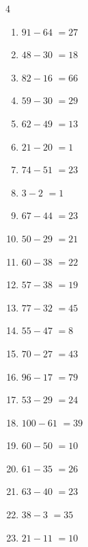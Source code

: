 \begin{multicols}{4}
\begin{enumerate}
  \item $91-64$
        $=27$

  \item $48-30$
        $=18$

  \item $82-16$
        $=66$

  \item $59-30$
        $=29$

  \item $62-49$
        $=13$

  \item $21-20$
        $=1$

  \item $74-51$
        $=23$

  \item $3-2$
        $=1$

  \item $67-44$
        $=23$

  \item $50-29$
        $=21$

  \item $60-38$
        $=22$

  \item $57-38$
        $=19$

  \item $77-32$
        $=45$

\columnbreak %

  \item $55-47$
        $=8$

  \item $70-27$
        $=43$

  \item $96-17$
        $=79$

  \item $53-29$
        $=24$

  \item $100-61$
        $=39$

  \item $60-50$
        $=10$

  \item $61-35$
        $=26$

  \item $63-40$
        $=23$

  \item $38-3$
        $=35$

  \item $21-11$
        $=10$


\end{enumerate}
\end{multicols}
